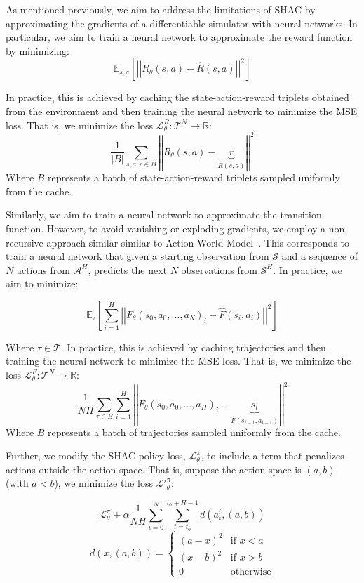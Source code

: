 As mentioned previously, we aim to address the limitations of SHAC by approximating the gradients of a differentiable simulator with neural networks. In particular, we aim to train a neural network to approximate the reward function by minimizing: 
$$ \mathbb{E}_{s,a}\left[\left|\left| R_{\theta}(s, a) - \hat{R}(s, a) \right|\right|^2\right] $$

In practice, this is achieved by caching the state-action-reward triplets obtained from the environment and then training the neural network to minimize the MSE loss. That is, we minimize the loss $\mathcal{L}_\theta^{R}:\mathcal{T}^N\rightarrow\mathbb{R}$:
$$ \frac{1}{\left|B\right|}\sum_{s,a,r \in B}\left|\left| R_\theta(s, a) - \underbrace{r}_{\hat{R}(s, a)} \right|\right|^2 $$
Where $B$ represents a batch of state-action-reward triplets sampled uniformly from the cache.

Similarly, we aim to train a neural network to approximate the transition function. However, to avoid vanishing or exploding gradients, we employ a non-recursive approach similar similar to Action World Model~\cite{Ma24}. This corresponds to train a neural network that given a starting observation from $\mathcal{S}$ and a sequence of $N$ actions from $\mathcal{A}^H$, predicts the next $N$ observations from $\mathcal{S}^H$. In practice, we aim to minimize:

$$ \mathbb{E}_{\tau}\left[\sum_{i=1}^H \left|\left| F_{\theta}(s_0, a_0, \dots, a_N)_i - \hat{F}(s_i, a_i) \right|\right|^2\right] $$

Where $\tau\in\mathcal{T}$. In practice, this is achieved by caching trajectories and then training the neural network to minimize the MSE loss. That is, we minimize the loss $\mathcal{L}_\theta^{F}:\mathcal{T}^N\rightarrow\mathbb{R}$:
$$ \frac{1}{NH}\sum_{\tau \in B}\sum_{i=1}^H\left|\left| F_{\theta}(s_0, a_0, \dots, a_H)_i - \underbrace{s_{i}}_{\hat{F}(s_{i-1}, a_{i-1})} \right|\right|^2 $$
Where $B$ represents a batch of trajectories sampled uniformly from the cache.

Further, we modify the SHAC policy loss, $\mathcal{L}_\theta^{\pi}$, to include a term that penalizes actions outside the action space. That is, suppose the action space is $(a,b)$ (with $a<b$), we minimize the loss $\mathcal{L'}_\theta^\pi:$

$$\mathcal{L}_\theta^\pi + \alpha \frac{1}{NH}\sum_{i=0}^N\sum_{t=t_0}^{t_0+H-1} d(a_t^i,(a,b))$$
$$d(x,(a,b)) = \begin{cases}(a-x)^2 & \text{if } x < a \\ (x-b)^2 & \text{if } x > b \\ 0 & \text{otherwise} \end{cases}$$

